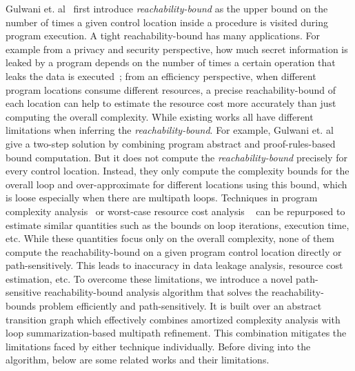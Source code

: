 
Gulwani et. al~\cite{GulwaniZ10} first introduce \emph{reachability-bound} as the upper bound on the number of times a given control location 
inside a procedure is visited during program execution.
A tight reachability-bound has many applications.
For example from a privacy and security perspective,
how much secret information is leaked by a program depends on the number of times a certain operation that leaks the data
is executed~\cite{Malacaria07};
from an efficiency perspective, when different program locations consume different resources, a precise reachability-bound of each location can help to estimate the resource cost more accurately than just computing the overall complexity.
While existing works all have different limitations when inferring the \emph{reachability-bound}.
For example, Gulwani et. al~\cite{GulwaniZ10}
give a two-step solution by combining program abstract and proof-rules-based bound computation.
But it does not compute the \emph{reachability-bound} precisely for every control location.
Instead, they only compute the complexity bounds for the overall loop and over-approximate for different locations using this bound,
which is loose especially when there are multipath loops.
Techniques in program complexity analysis~\cite{GustafssonEL05,HumenbergerJK18} 
or worst-case resource cost analysis
~\cite{BrockschmidtEFFG16,AlbertAGP08,AliasDFG10,Flores-MontoyaH14} can be repurposed to estimate similar quantities such as the
bounds on loop iterations, execution time, etc.
While these quantities focus only on 
the overall complexity,
none of them compute the reachability-bound on a given program control location directly or path-sensitively.
This leads to inaccuracy in data leakage analysis, resource cost estimation, etc.
To overcome these limitations, 
we introduce a novel path-sensitive reachability-bound analysis algorithm that solves 
the reachability-bounds problem efficiently and path-sensitively.
It is built over an abstract transition graph which effectively combines amortized complexity analysis with loop summarization-based multipath refinement.
This combination mitigates the limitations faced by either technique individually. 
Before diving into the algorithm, below are some related works and their limitations.

